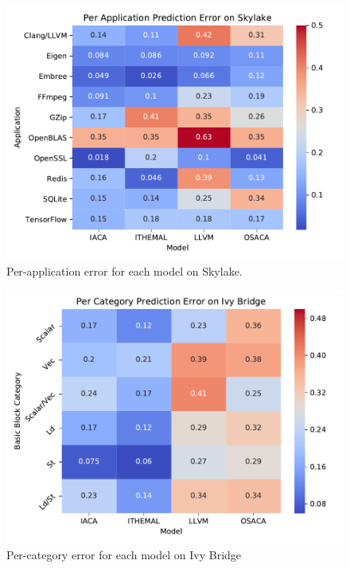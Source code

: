 \begin{figure}
\includegraphics[width=\columnwidth]{figures/skl-app-err.pdf}
\caption{Per-application error for each model on Skylake. }
\label{fig:skl-app-err}
\end{figure}

\begin{figure}
\includegraphics[width=\columnwidth]{figures/ivb-cluster-err.pdf}
\caption{Per-category error for each model on Ivy Bridge}
\label{fig:ivb-cluster-err}
\end{figure}


